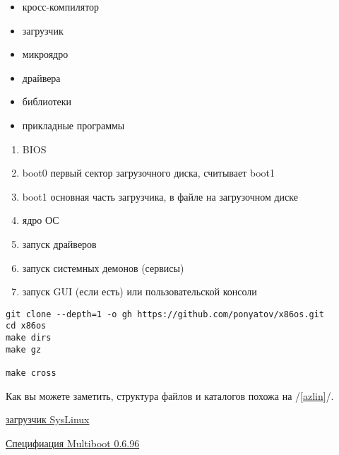 
\begin{itemize}
  \item кросс-компилятор
  \item загрузчик
  \item микроядро
  \item драйвера
  \item библиотеки
  \item прикладные программы
\end{itemize}


\begin{enumerate}
  \item BIOS
  \item boot0 первый сектор загрузочного диска, считывает boot1
  \item boot1 основная часть загрузчика, в файле на загрузочном диске
  \item ядро ОС
  \item запуск драйверов
  \item запуск системных демонов (сервисы)
  \item запуск GUI (если есть) или пользовательской консоли
\end{enumerate}


\begin{verbatim}
git clone --depth=1 -o gh https://github.com/ponyatov/x86os.git
cd x86os 
make dirs
make gz

make cross
\end{verbatim}


Как вы можете заметить, структура файлов и каталогов похожа на
 /\ref{azlin}/.


\href{http://www.syslinux.org/}{загрузчик SysLinux}

\href{http://www.gnu.org/software/grub/manual/multiboot/multiboot.html}{Специфиация
Multiboot 0.6.96}

\secdown



\secdown
{}
\secup

\secup

\secup
